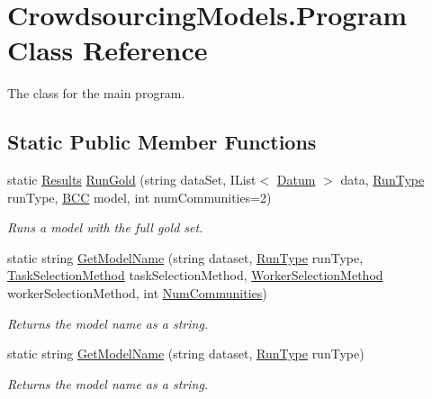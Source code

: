 \hypertarget{class_crowdsourcing_models_1_1_program}{}\section{Crowdsourcing\+Models.\+Program Class Reference}
\label{class_crowdsourcing_models_1_1_program}


The class for the main program.  


\subsection*{Static Public Member Functions}
\begin{DoxyCompactItemize}
\item 
static \hyperlink{class_crowdsourcing_models_1_1_results}{Results} \hyperlink{class_crowdsourcing_models_1_1_program_a0c8aba76a474add91e7ae5a31afb3a14}{Run\+Gold} (string data\+Set, I\+List$<$ \hyperlink{class_crowdsourcing_models_1_1_datum}{Datum} $>$ data, \hyperlink{namespace_crowdsourcing_models_ae187d0e1d9fe64e7ebcb9d948d02d2d0}{Run\+Type} run\+Type, \hyperlink{class_crowdsourcing_models_1_1_b_c_c}{B\+C\+C} model, int num\+Communities=2)
\begin{DoxyCompactList}\small\item\em Runs a model with the full gold set. \end{DoxyCompactList}\item 
static string \hyperlink{class_crowdsourcing_models_1_1_program_a277c2d73fa1de5d400eb0ae1925c014f}{Get\+Model\+Name} (string dataset, \hyperlink{namespace_crowdsourcing_models_ae187d0e1d9fe64e7ebcb9d948d02d2d0}{Run\+Type} run\+Type, \hyperlink{namespace_crowdsourcing_models_a1bb21d66b6c86daa36af97d919528356}{Task\+Selection\+Method} task\+Selection\+Method, \hyperlink{namespace_crowdsourcing_models_a1f0e849dc0691caa8fda0ce7778756a6}{Worker\+Selection\+Method} worker\+Selection\+Method, int \hyperlink{class_crowdsourcing_models_1_1_program_aaf063cf9af3dc47e84aaab11562a5b12}{Num\+Communities})
\begin{DoxyCompactList}\small\item\em Returns the model name as a string. \end{DoxyCompactList}\item 
static string \hyperlink{class_crowdsourcing_models_1_1_program_a1c0be23ce716b7d30addb497a0185861}{Get\+Model\+Name} (string dataset, \hyperlink{namespace_crowdsourcing_models_ae187d0e1d9fe64e7ebcb9d948d02d2d0}{Run\+Type} run\+Type)
\begin{DoxyCompactList}\small\item\em Returns the model name as a string. \end{DoxyCompactList}\end{DoxyCompactItemize}
